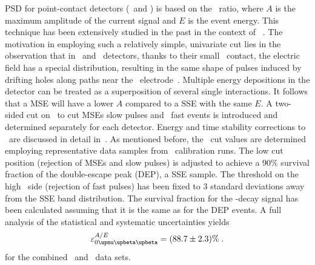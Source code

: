 PSD for point-contact detectors (\bege\ and \icoax) is based on the \aoe\ ratio, where $A$
is the maximum amplitude of the current signal and $E$ is the event energy. This technique
has been extensively studied in the past in the context of \gerda~\cite{Agostini2013,
Agostini2010, Budjas2008, Budjas2009, Budjas2009a, Agostini2010a}. The motivation in
employing such a relatively simple, univariate cut lies in the observation that in
\bege\ and \icoax\ detectors, thanks to their small \pplus\ contact, the electric field
has a special distribution, resulting in the same shape of pulses induced by drifting
holes along paths near the \pplus\ electrode~\cite{Agostini2010}. Multiple energy
depositions in the detector can be treated as a superposition of several single
interactions. It follows that a MSE will have a lower $A$ compared to a SSE with the
same $E$.  A two-sided cut on \aoe\ to cut MSEs slow pulses and \pplus\ fast events is
introduced and determined separately for each detector. Energy and time stability
corrections to \aoe\ are discussed in detail in~\cite{Agostini2021a}. As mentioned before,
the \aoe\ cut values are determined employing representative data samples from \Th\
calibration runs.  The low cut position (rejection of MSEs and slow pulses) is adjusted
to achieve a 90\% survival fraction of the double-escape peak (DEP), a SSE sample. The
threshold on the high \aoe\ side (rejection of fast pulses) has been fixed to 3 standard
deviations away from the SSE band distribution. The survival fraction for the
\onbb-decay signal has been calculated assuming that it is the same as for the DEP
events. A full analysis of the statistical and systematic uncertainties yields
\[
  \epsilon_\onbbM^{A/E} = (88.7 \pm 2.3)\% \;.
\]
for the combined \bege\ and \icoax\ data sets.

